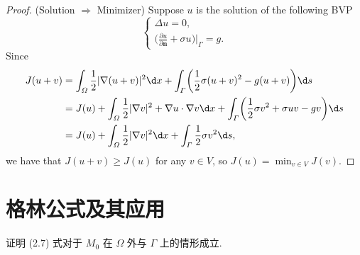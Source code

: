 \begin{proof}
  (Solution $\Rightarrow$ Minimizer) Suppose $u$ is the solution of the following BVP
  \[\begin{cases}
    \Delta u = 0, \\
    \bigl(\frac{\partial u}{\partial \bm{n}} + \sigma u\bigr)\big|_{\varGamma} = g.
  \end{cases}\]
  Since
  \begin{equation}\label{eq:e12}
    \begin{aligned}
      J(u+v)
      & = \int_\varOmega \frac12 |\nabla(u+v)|^2 \d x
          + \int_\varGamma \biggl(\frac12 \sigma (u+v)^2 - g(u+v)\biggr) \d s \\
      & = J(u) + \int_\varOmega \frac12 |\nabla v|^2 + \nabla u\cdot\nabla v \d x
          + \int_\varGamma \biggl(\frac12 \sigma v^2 + \sigma uv - gv\biggr) \d s \\
      & = J(u) + \int_\varOmega \frac12 |\nabla v|^2 \d x
          + \int_\varGamma \frac12 \sigma v^2 \d s,
    \end{aligned}
  \end{equation}
  we have that $J(u+v)\geq J(u)$ for any $v\in V$, so $J(u) = \min_{v\in V} J(v)$.
\end{proof}



\section{格林公式及其应用}

\begin{exercise}
  证明 (2.7) 式对于 $M_0$ 在 $\varOmega$ 外与 $\varGamma$ 上的情形成立.
\end{exercise}

